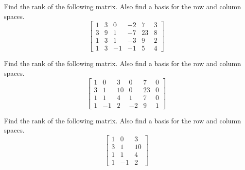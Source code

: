 \documentclass{ximera}
\begin{document}
\begin{problem}\label{prb:5.33} Find the rank of the following matrix. Also find a basis for the row
and column spaces.
\begin{equation*}
\left[
\begin{array}{rrrrrr}
1 & 3 & 0 & -2 & 7 & 3 \\
3 & 9 & 1 & -7 & 23 & 8 \\
1 & 3 & 1 & -3 & 9 & 2 \\
1 & 3 & -1 & -1 & 5 & 4
\end{array}
\right]
\end{equation*}
\end{problem}

\begin{problem}\label{prb:5.34} Find the rank of the following matrix. Also find a basis for the row
and column spaces.
\begin{equation*}
\left[
\begin{array}{rrrrrr}
1 & 0 & 3 & 0 & 7 & 0 \\
3 & 1 & 10 & 0 & 23 & 0 \\
1 & 1 & 4 & 1 & 7 & 0 \\
1 & -1 & 2 & -2 & 9 & 1
\end{array}
\right]
\end{equation*}

\end{problem}

\begin{problem}\label{prb:5.35} Find the rank of the following matrix. Also find a basis for the row and column spaces.
\begin{equation*}
\left[
\begin{array}{rrr}
1 & 0 & 3 \\
3 & 1 & 10 \\
1 & 1 & 4 \\
1 & -1 & 2
\end{array}
\right]
\end{equation*}

\end{problem}
\end{document}
